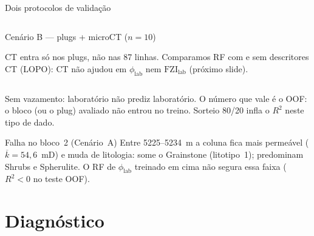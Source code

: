 \documentclass[aspectratio=169,10pt]{beamer}
\newcommand{\philab}{\ensuremath{\phi_{\mathrm{lab}}}}
\newcommand{\fzilab}{\ensuremath{\mathrm{FZI}_{\mathrm{lab}}}}
\begin{document}
\begin{frame}{Dois protocolos de validação}
\begin{columns}[T,onlytextwidth]
\begin{exampleblock}{Cenário B --- plugs + microCT ($n=10$)}
      \centering
      \vspace{0.06cm}

      {\tiny
      CT entra só nos plugs, não nas 87 linhas.
      Comparamos RF com e sem descritores CT (LOPO): CT não ajudou
      em \philab{} nem \fzilab{} (próximo slide).}
    \end{exampleblock}
  \end{columns}

  \vspace{0.04cm}
  {\scriptsize
  Sem vazamento: laboratório não prediz laboratório.
  O número que vale é o OOF: o bloco (ou o plug) avaliado não entrou
  no treino. Sorteio 80/20 infla o $R^2$ neste tipo de dado.}

  \vspace{0.04cm}
  \begin{block}{Falha no bloco~2 (Cenário~A)}
    \scriptsize
    Entre 5225--5234~m a coluna fica mais permeável ($\overline{k}=54{,}6$~mD)
    e muda de litologia: some o Grainstone (litotipo~1); predominam Shrubs
    e Spherulite. O RF de \philab{} treinado em cima não segura essa faixa
    ($R^2<0$ no teste OOF).
  \end{block}
\end{frame}

\section{Diagnóstico}
\end{document}
